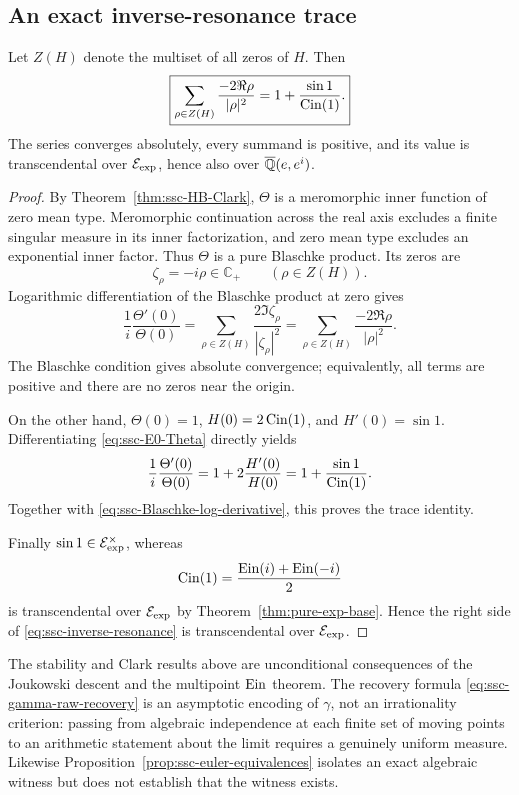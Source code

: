 \subsection{An exact inverse-resonance trace}

\begin{theorem}
\label{thm:ssc-inverse-resonance}
Let \(Z(H)\) denote the multiset of all zeros of \(H\).  Then
\begin{equation}\label{eq:ssc-inverse-resonance}
 \boxed{
 \sum_{\rho\in Z(H)}\frac{-2\Re\rho}{|\rho|^2}
 =1+\frac{\sin1}{\operatorname{Cin}(1)}.}
\end{equation}
The series converges absolutely, every summand is positive, and its value
is transcendental over \(\mathcal E_{\mathrm{exp}}\), hence also over
\(\overline{\mathbb Q}(e,e^i)\).
\end{theorem}

\begin{proof}
By Theorem~\ref{thm:ssc-HB-Clark}, \(\Theta\) is a meromorphic inner
function of zero mean type.  Meromorphic continuation across the real axis
excludes a finite singular measure in its inner factorization, and zero
mean type excludes an exponential inner factor.  Thus \(\Theta\) is a
pure Blaschke product.  Its zeros are
\[
 \zeta_\rho=-i\rho\in\mathbb C_+
 \qquad(\rho\in Z(H)).
\]
Logarithmic differentiation of the Blaschke product at zero gives
\begin{equation}\label{eq:ssc-Blaschke-log-derivative}
 \frac1i\frac{\Theta'(0)}{\Theta(0)}
 =\sum_{\rho\in Z(H)}
   \frac{2\Im\zeta_\rho}{|\zeta_\rho|^2}
 =\sum_{\rho\in Z(H)}
   \frac{-2\Re\rho}{|\rho|^2}.
\end{equation}
The Blaschke condition gives absolute convergence; equivalently, all terms
are positive and there are no zeros near the origin.

On the other hand, \(\Theta(0)=1\),
\(H(0)=2\operatorname{Cin}(1)\), and \(H'(0)=\sin1\).  Differentiating
\eqref{eq:ssc-E0-Theta} directly yields
\begin{equation}\label{eq:ssc-origin-phase-derivative}
 \frac1i\frac{\Theta'(0)}{\Theta(0)}
 =1+2\frac{H'(0)}{H(0)}
 =1+\frac{\sin1}{\operatorname{Cin}(1)}.
\end{equation}
Together with \eqref{eq:ssc-Blaschke-log-derivative}, this proves the
trace identity.

Finally \(\sin1\in\mathcal E_{\mathrm{exp}}^\times\), whereas
\[
 \operatorname{Cin}(1)=\frac{\operatorname{Ein}(i)+\operatorname{Ein}(-i)}2
\]
is transcendental over \(\mathcal E_{\mathrm{exp}}\) by
Theorem~\ref{thm:pure-exp-base}.  Hence the right side of
\eqref{eq:ssc-inverse-resonance} is transcendental over \(\mathcal E_{\mathrm{exp}}\).
\end{proof}

\begin{remark}
The stability and Clark results above are unconditional consequences of
the Joukowski descent and the multipoint \(\operatorname{Ein}\) theorem.  The recovery
formula \eqref{eq:ssc-gamma-raw-recovery} is an asymptotic encoding of
\(\gamma\), not an irrationality criterion: passing from algebraic
independence at each finite set of moving points to an arithmetic statement
about the limit requires a genuinely uniform measure.  Likewise
Proposition~\ref{prop:ssc-euler-equivalences} isolates an exact algebraic
witness but does not establish that the witness exists.
\end{remark}
